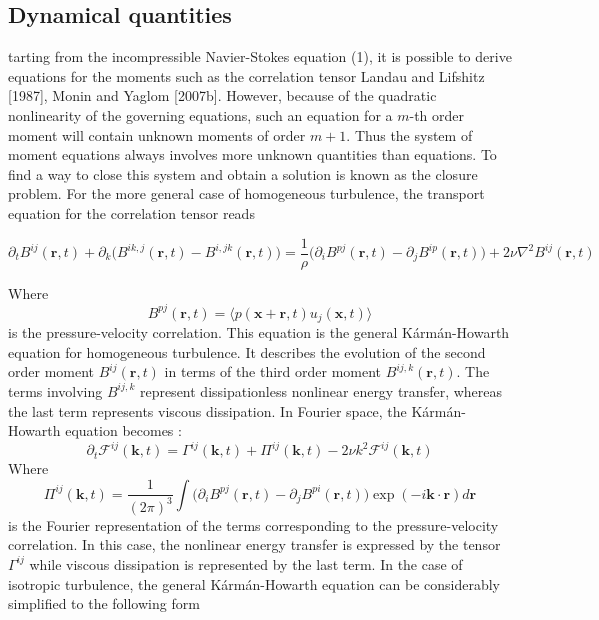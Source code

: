\subsection{Dynamical quantities}
tarting from the incompressible Navier-Stokes equation (1), it is possible to derive equations for the moments such as the correlation tensor Landau and Lifshitz [1987], Monin and Yaglom [2007b]. However,
because of the quadratic nonlinearity of the governing equations, such an equation for a $m$-th order moment will contain unknown moments of order $m + 1$. Thus the system of moment equations always involves more unknown quantities than equations. To find a way to close this system and obtain a solution is known as the closure problem. For the more general case of homogeneous turbulence, the transport equation for the correlation tensor reads
\begin{fullwidth}
\begin{equation}
    \partial_t B^{ij}(\mathbf{r},t)+\partial_k \big(B^{ik,j}(\mathbf{r},t)-B^{i,jk}(\mathbf{r},t)\big)=\frac{1}{\rho}\big(\partial_i B^{pj}(\mathbf{r},t)-\partial_j B^{ip}(\mathbf{r},t)\big)+2\nu\nabla^2B^{ij}(\mathbf{r},t)
\end{equation}
\end{fullwidth}
Where
\begin{equation}
    B^{pj}(\mathbf{r},t)=\langle p(\mathbf{x}+\mathbf{r},t)u_j(\mathbf{x},t)\rangle
\end{equation}
is the pressure-velocity correlation. This equation is the general Kármán-Howarth equation for homogeneous turbulence. It describes the evolution of the second order moment $B^{ij}(\mathbf{r},t)$ in terms of the third order moment $B^{ij,k}(\mathbf{r},t)$. The terms involving $B^{ij,k}$ represent dissipationless nonlinear energy transfer, whereas the last term represents viscous dissipation. In Fourier space, the Kármán-Howarth equation becomes :
\begin{equation}
    \partial_t\mathcal{F}^{ij}(\mathbf{k},t)=\Gamma^{ij}(\mathbf{k},t)+\Pi^{ij}(\mathbf{k},t)-2\nu k^2\mathcal{F}^{ij}(\mathbf{k},t)
\end{equation}
Where
\begin{equation}
    \Pi^{ij}(\mathbf{k},t)=\frac{1}{(2\pi)^3}\int\big(\partial_i B^{pj}(\mathbf{r},t)-\partial_jB^{pi}(\mathbf{r},t)\big)\exp(-i\mathbf{k}\cdot\mathbf{r})d\mathbf{r}
\end{equation}
is the Fourier representation of the terms corresponding to the pressure-velocity correlation. In this case, the nonlinear energy transfer is expressed by the tensor $\Gamma^{ij}$ while viscous dissipation is represented by the last term. In the case of isotropic turbulence, the general Kármán-Howarth  equation can be considerably simplified to the following form
